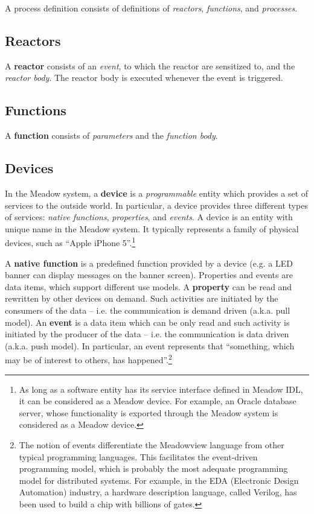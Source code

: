 \documentclass{myproc}
\begin{document}
A process definition consists of 
definitions of {\em reactors\/}, {\em functions\/}, and {\em processes\/}.


\subsection{Reactors}
A \textcolor{blue2}{\textbf{reactor}} consists of an {\em event\/}, to
which the reactor are sensitized to, and the {\em reactor body\/}. 
The reactor body is executed whenever the event is triggered.

\subsection{Functions}
A \textcolor{blue2}{\textbf{function}} consists of {\em parameters\/} and
the {\em function body\/}. 



\subsection{Devices}
In the Meadow system, a \textcolor{blue2}{\bf{}device} is a {\em
  programmable\/} entity which provides a set of services to the outside
world. In particular, a device provides three different types of services:
\textcolor{blue2}{\em native functions\/}, \textcolor{blue2}{\em 
  properties}, and \textcolor{blue2}{\em events}. A device is an entity with
unique name in the Meadow system. It typically represents a 
family of physical devices, such as ``Apple iPhone
5''.\footnote{As long as a software entity has its service interface defined
in Meadow IDL, it can be considered as a Meadow device. For example, an Oracle
database server, whose functionality is exported through the Meadow system is
considered as a Meadow device.}

A \textcolor{blue2}{\bf{}native function} is a predefined function provided by
a device (e.g. a LED banner can display messages on the banner screen). 
Properties and events are data items, which support different use models.
A \textcolor{blue2}{\bf{}property} can be read and rewritten by other devices
on demand. Such activities are initiated by the consumers of the data --
i.e. the communication is demand driven (a.k.a. pull model).
An \textcolor{blue2}{\bf{}event} is a data item which can be only
read and such activity is initiated by the producer of the data -- i.e. the
communication is data driven (a.k.a. push model). 
In particular, an event represents that ``something, which may be of interest
to others, has happened''.\footnote{The notion of events differentiate the
Meadowview language from other typical programming languages. This
facilitates the event-driven programming model, which is probably the 
most adequate programming model for distributed systems. For example, in the
EDA (Electronic Design Automation) industry, a hardware description language,
called Verilog, has been used to build a chip with billions of gates.}
\end{document}
